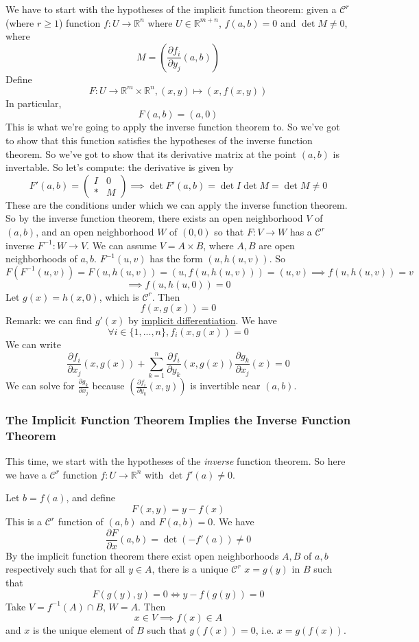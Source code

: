\documentclass{article}
\newcommand{\reals}[0]{\mathbb{R}}
\newcommand{\mc}[1]{\mathcal{#1}}
\newcommand{\prt}[2]{\frac{\partial #1}{\partial #2}}
\begin{document}
We have to start with the hypotheses of the implicit function theorem: given a \(\mc{C}^r\) (where \(r \geq 1\)) function
\(f: U \to \reals^n\)
where \(U \in \reals^{m + n}\), \(f(a, b) = 0\) and \(\det M \neq 0\), where
\[M = \left(\prt{f_i}{y_j}(a, b)\right)\]
Define
\[F: U \to \reals^m\times\reals^n, (x, y) \mapsto (x, f(x, y))\]
In particular,
\[F(a, b) = (a, 0)\]
This is what we're going to apply the inverse function theorem to. So we've got to show that this function satisfies the hypotheses of the inverse function theorem. So we've got to show that its derivative matrix at the point \((a, b)\) is invertable. So let's compute: the derivative is given by
\[F'(a, b) = \left(\begin{array}{c|c} I & 0 \\ \hline * & M \end{array}\right) \implies \det F'(a, b) = \det I \det M = \det M \neq 0\]
These are the conditions under which we can apply the inverse function theorem. So by the inverse function theorem, there exists an open neighborhood \(V\) of \((a, b)\), and an open neighborhood \(W\) of \((0, 0)\) so that \(F: V \to W\) has a \(\mc{C}^r\) inverse
\(F^{-1}: W \to V\). We can assume \(V = A \times B\), where \(A, B\) are open neighborhoods of \(a, b\). \(F^{-1}(u, v)\) has the form \((u, h(u, v))\). So
\[F(F^{-1}(u, v)) = F(u, h(u, v)) = (u, f(u, h(u, v))) = (u, v) \implies f(u, h(u, v)) = v\]
\[\implies f(u, h(u, 0)) = 0\]
Let \(g(x) = h(x, 0)\), which is \(\mc{C}^r\). Then
\[f(x, g(x)) = 0\]
Remark: we can find \(g'(x)\) by \underline{implicit differentiation}. We have
\[\forall i \in \{1,...,n\}, f_i(x, g(x)) = 0\]
We can write
\[\prt{f_i}{x_j}(x, g(x)) + \sum_{k = 1}^n\prt{f_i}{y_k}(x, g(x))\prt{g_k}{x_j}(x) = 0\]
We can solve for \(\prt{g_k}{x_j}\) because \(\left(\prt{f_i}{y_k}(x, y)\right)\) is invertible near \((a, b)\).

\subsubsection{The Implicit Function Theorem Implies the Inverse Function Theorem}

This time, we start with the hypotheses of the \textit{inverse} function theorem. So here we have a \(\mc{C}^r\) function \(f: U \to \reals^n\) with \(\det f'(a) \neq 0\).

Let \(b = f(a)\), and define
\[F(x, y) = y - f(x)\]
This is a \(\mc{C}^r\) function of \((a, b)\) and \(F(a, b) = 0\). We have
\[\prt{F}{x}(a, b) = \det(-f'(a)) \neq 0\]
By the implicit function theorem there exist open neighborhoods \(A, B\) of \(a, b\) respectively such that for all \(y \in A\), there is a unique \(\mc{C}^r\) \(x = g(y)\) in \(B\) such that
\[F(g(y), y) = 0 \iff y - f(g(y)) = 0\]
Take \(V = f^{-1}(A) \cap B\), \(W = A\). Then
\[x \in V \implies f(x) \in A\]
and \(x\) is the unique element of \(B\) such that \(g(f(x)) = 0\), i.e. \(x = g(f(x))\).
\end{document}
